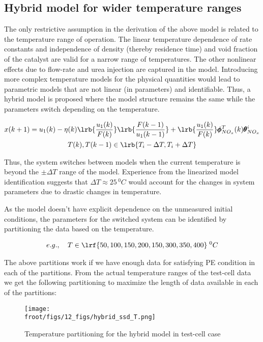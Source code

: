\subsection{Hybrid model for wider temperature ranges}

The only restrictive assumption in the derivation of the above model is related to the temperature range of operation.
The linear temperature dependence of rate constants and independence of density (thereby residence time) and void
fraction of the catalyst are valid for a narrow range of temperatures. The other nonlinear effects due to flow-rate and
urea injection are captured in the model. Introducing more complex temperature models for the physical quantities would
lead to parametric models that are not linear (in parameters) and identifiable. Thus, a hybrid model is proposed where
the model structure remains the same while the parameters switch depending on the temperature.

\begin{multline}
        x(k+1) = u_1(k) - \eta(k) \lrb{\frac{u_1(k)}{F(k)}} \lrb{\frac{F(k-1)}{u_1(k-1)}}
                        + \lrb{\frac{u_1(k)}{F(k)}} \pmb \phi^{T}_{NO_x}(k) \pmb \theta^i_{NO_x}
        \\
        T(k), T(k-1) \in \lrb{T_i-\Delta T, T_i + \Delta T}
\end{multline}

Thus, the system switches between models when the current temperature is beyond the $\pm \Delta T$ range of the model.
Experience from the linearized model identification suggests that $\Delta T \approx 25 \, ^0C$ would account for
the changes in system parameters due to drastic changes in temperature.

As the model doesn't have explicit dependence on the unmeasured initial conditions, the parameters for the switched system can be identified by partitioning the data based on the temperature.

\begin{align}
        e.g., \quad T \in \lrf{50, 100, 150, 200, 150, 300, 350, 400} \; ^0C
\end{align}

The above partitions work if we have enough data for satisfying PE condition in each of the partitions. From the actual temperature ranges of the test-cell data we get the following partitioning to maximize the length of data available in each of the partitions:


\begin{figure}[H]
        \centering
        \texttt{[image: \\froot/figs/12\_figs/hybrid\_ssd\_T.png]}
        \caption{Temperature partitioning for the hybrid model in test-cell case}
\end{figure}

